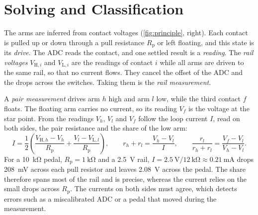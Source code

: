 
\section{Solving and Classification}
\label{sec:pair-measurement}

The arms are inferred from contact voltages (\cref{fig:principle}, right). Each contact is pulled up or down through a pull resistance $R_\mathrm{p}$ or left floating, and this state is its \emph{drive}. The ADC reads the contact, and one settled result is a \emph{reading}. The \emph{rail voltages} $V_{\mathrm{H},i}$ and $V_{\mathrm{L},i}$ are the readings of contact $i$ while all arms are driven to the same rail, so that no current flows. They cancel the offset of the ADC and the drops across the switches. Taking them is the \emph{rail measurement}.

A \emph{pair measurement} drives arm $h$ high and arm $l$ low, while the third contact $f$ floats. The floating arm carries no current, so its reading $V_f$ is the voltage at the star point. From the readings $V_h$, $V_l$ and $V_f$ follow the loop current $I$, read on both sides, the pair resistance and the share of the low arm:
\begin{equation}
  I = \frac{1}{2}\left(\frac{V_{\mathrm{H},h} - V_h}{R_\mathrm{p}} + \frac{V_l - V_{\mathrm{L},l}}{R_\mathrm{p}}\right),
  \qquad
  r_h + r_l = \frac{V_h - V_l}{I},
  \qquad
  \frac{r_l}{r_h + r_l} = \frac{V_f - V_l}{V_h - V_l}.
  \label{eq:pair}
\end{equation}
For a \qty{10}{\kilo\ohm} pedal, $R_\mathrm{p} = \qty{1}{\kilo\ohm}$ and a \qty{2.5}{\volt} rail, $I = \qty{2.5}{\volt}/\qty{12}{\kilo\ohm} \approx \qty{0.21}{\milli\ampere}$ drops \qty{208}{\milli\volt} across each pull resistor and leaves \qty{2.08}{\volt} across the pedal. The share therefore spans most of the rail and is precise, whereas the current relies on the small drops across $R_\mathrm{p}$. The currents on both sides must agree, which detects errors such as a miscalibrated ADC or a pedal that moved during the measurement.

